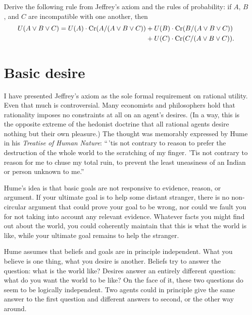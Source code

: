 \begin{exercise}
  Derive the following rule from Jeffrey's axiom and the rules of probability: 
  if $A$, $B$, and $C$ are incompatible with one another, then 
  \begin{align*} U(A \lor B \lor C) =
  U(A)\cdot \text{Cr}(A/(A\lor B \lor C)) &+ U(B)\cdot \text{Cr}(B/(A \lor B \lor C))\\
  &+ U(C)\cdot\text{Cr}(C/(A \lor B\lor C)).
  \end{align*}
  \vspace{-5mm}
\end{exercise}


\section{Basic desire}\label{sec:basic-desire}


I have presented Jeffrey's axiom as the sole formal requirement on
rational utility. Even that much is controversial. Many economists and
philosophers hold that rationality imposes no constraints at all on an
agent's desires. (In a way, this is the opposite extreme of the
hedonist doctrine that all rational agents desire nothing but their
own pleasure.) The thought was memorably expressed by Hume in his
\emph{Treatise of Human Nature}: ``\,'tis not contrary to reason to
prefer the destruction of the whole world to the scratching of my
finger. 'Tis not contrary to reason for me to chuse my total ruin, to
prevent the least uneasiness of an Indian or person unknown to me.''

Hume's idea is that basic goals are not responsive to evidence,
reason, or argument. If your ultimate goal is to help some distant
stranger, there is no non-circular argument that could prove your goal
to be wrong, nor could we fault you for not taking into account any
relevant evidence. Whatever facts you might find out about the world,
you could coherently maintain that this is what the world is like,
while your ultimate goal remains to help the stranger.

Hume assumes that beliefs and goals are in principle independent. What
you believe is one thing, what you desire is another. Beliefs try to
answer the question: what is the world like? Desires answer an
entirely different question: what do you want the world to be like?
On the face of it, these two questions do seem to be logically
independent. Two agents could in principle give the same answer to the
first question and different answers to second, or the other way
around.

